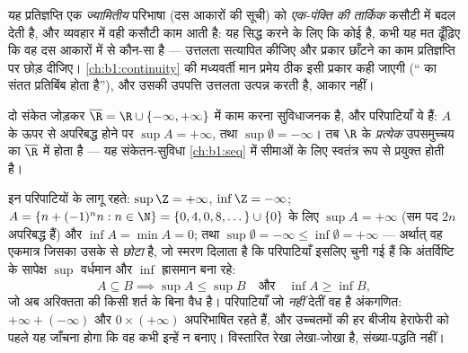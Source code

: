 \begin{remark}[उत्तलता ही सही कसौटी क्यों है]
यह प्रतिज्ञप्ति एक \emph{ज्यामितीय} परिभाषा (दस आकारों की सूची) को
\emph{एक-पंक्ति की तार्किक} कसौटी में बदल देती है, और व्यवहार में वही कसौटी
काम आती है: यह सिद्ध करने के लिए कि कोई   है, कभी यह मत ढूँढ़िए
कि वह दस आकारों में से कौन-सा है --- उत्तलता सत्यापित कीजिए और प्रकार छाँटने
का काम प्रतिज्ञप्ति पर छोड़ दीजिए। \cref{ch:b1:continuity} की मध्यवर्ती मान
प्रमेय ठीक इसी प्रकार कही जाएगी (`` का संतत प्रतिबिंब  होता
है''), और उसकी उपपत्ति उत्तलता उत्पन्न करती है, आकार नहीं।
\end{remark}

\begin{remark}[विस्तारित वास्तविक रेखा]
दो संकेत जोड़कर $\overline\R = \R \cup \{-\infty, +\infty\}$ में काम करना
सुविधाजनक है, और परिपाटियाँ ये हैं: $A$ के ऊपर से अपरिबद्ध होने पर $\sup A =
+\infty$, तथा $\sup \emptyset = -\infty$। तब $\R$ के \emph{प्रत्येक}
उपसमुच्चय का $\overline\R$ में  होता है --- यह संकेतन-सुविधा
\cref{ch:b1:seq} में सीमाओं के लिए स्वतंत्र रूप से प्रयुक्त होती है।
\end{remark}

\begin{example}\label{ex:b1:reals:extendedcompute}
इन परिपाटियों के लागू रहते: $\sup \Z = +\infty$, $\inf \Z = -\infty$; $A =
\{n + (-1)^n n : n \in \N\} = \{0, 4, 0, 8, \dots\} \cup \{0\}$ के लिए $\sup
A = +\infty$ (सम पद $2n$ अपरिबद्ध हैं) और $\inf A = \min A = 0$; तथा
$\sup\emptyset = -\infty \leq \inf\emptyset = +\infty$ --- अर्थात् वह
एकमात्र  जिसका  उसके  से \emph{छोटा} है, जो स्मरण दिलाता
है कि परिपाटियाँ इसलिए चुनी गई हैं कि अंतर्विष्टि के सापेक्ष $\sup$ वर्धमान
और $\inf$ ह्रासमान बना रहे:
\[
A \subseteq B \implies \sup A \leq \sup B
\quad\text{और}\quad \inf A \geq \inf B ,
\]
जो अब अरिक्तता की किसी शर्त के बिना वैध है। परिपाटियाँ जो \emph{नहीं} देतीं
वह है अंकगणित: $+\infty + (-\infty)$ और $0 \times (+\infty)$ अपरिभाषित रहते
हैं, और उच्चतमों की हर बीजीय हेराफेरी को पहले यह जाँचना होगा कि वह कभी
इन्हें न बनाए। विस्तारित रेखा लेखा-जोखा है, संख्या-पद्धति नहीं।
\end{example}

